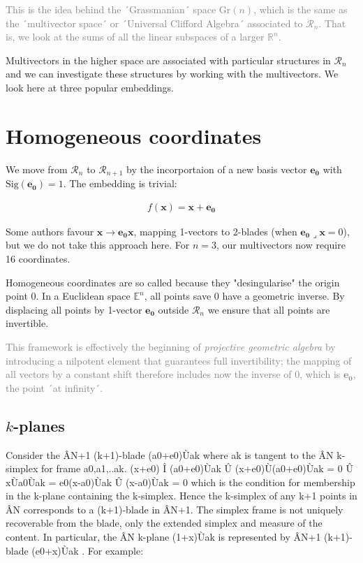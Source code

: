 \documentclass[a4paper]{book}
\numberwithin{equation}{chapter}
\begin{document}
\textcolor{gray}{This is the idea behind the ´Grassmanian´ space
$\text{Gr}(n)$, which is the same as the ´multivector space´ or ´Universal Clifford Algebra´
associated to $\mathcal{R}_n$. That is, we look at the sums of all the linear subspaces
of a larger $\mathbb{R}^n$.}

Multivectors in the higher space are associated with particular structures in 
$\mathcal{R}_n$ and we can investigate these structures by working with the multivectors.
We look here at three popular embeddings. 
    
    \section{Homogeneous coordinates}

We move from $\mathcal{R}_n$ to $\mathcal{R}_{n+1}$ 
by the incorportaion of a new basis vector $\mathbf{e_0}$ 
with $\text{Sig}(\mathbf{e_0})=1$. The embedding is trivial: 

\begin{align*}
    f(\mathbf{x}) = \mathbf{x} + \mathbf{e_0}
\end{align*}

Some authors favour $\mathbf{x} \rightarrow \mathbf{e_0 x}$, mapping 1-vectors 
to 2-blades (when $\mathbf{e_0 \lrcorner x} = 0$), but we do not take this approach here.
For $n=3$, our multivectors now require 16 coordinates.

\vspace{\baselineskip}

Homogeneous coordinates are so called because they "desingularise" the origin point 0. 
In a Euclidean space $\mathbb{E}^n$, all points save 0 have a geometric inverse. 
By displacing all points by 1-vector $\mathbf{e_0}$ 
outside $\mathcal{R}_n$ we ensure that all points are invertible.

\textcolor{gray}{This framework is effectively the beginning of \emph{projective geometric
algebra} by introducing a nilpotent element that guarantees full invertibility; the mapping
of all vectors by a constant shift therefore includes now the inverse of 0, which is 
$\mathbf{e_0}$, the point ´at infinity´.}


    \subsection{$k$-planes}

Consider the ÂN+1 (k+1)-blade (a0+e0)Ùak where ak is tangent to the ÂN k-simplex for frame { a0,a1,..ak}.
(x+e0) Î (a0+e0)Ùak Û (x+e0)Ù(a0+e0)Ùak = 0 Û xÙa0Ùak = e0(x-a0)Ùak
Û (x-a0)Ùak = 0 which is the condition for membership in the k-plane containing the k-simplex.
Hence the k-simplex of any k+1 points in ÂN corresponds to a (k+1)-blade in ÂN+1. The simplex frame is not uniquely recoverable from the blade, only the extended simplex and measure of the content. In particular, the ÂN k-plane (1+x)Ùak is represented by ÂN+1 (k+1)-blade (e0+x)Ùak .
For example: 
\end{document}
